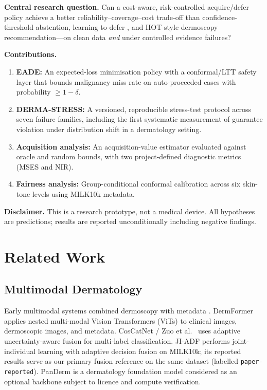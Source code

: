 \documentclass[conference]{IEEEtran}
\newcommand{\1}{\mathbf{1}}
\begin{document}
\medskip
\noindent\textbf{Central research question.} Can a cost-aware,
risk-controlled acquire/defer policy achieve a better
reliability--coverage--cost trade-off than confidence-threshold abstention,
learning-to-defer \cite{mozannar2020defer}, and HOT-style dermoscopy
recommendation---on clean data \emph{and} under controlled evidence failures?

\medskip
\noindent\textbf{Contributions.}
\begin{enumerate}[leftmargin=*, label=\textbf{C\arabic{enumi}.}]
  \item \textbf{EADE:} An expected-loss minimisation policy with a
        conformal/LTT safety layer that bounds malignancy miss rate
        on auto-proceeded cases with probability $\geq 1-\delta$.
  \item \textbf{DERMA-STRESS:} A versioned, reproducible stress-test
        protocol across seven failure families, including the first
        systematic measurement of guarantee violation under distribution
        shift in a dermatology setting.
  \item \textbf{Acquisition analysis:} An acquisition-value estimator
        evaluated against oracle and random bounds, with two
        project-defined diagnostic metrics (MSES and NIR).
  \item \textbf{Fairness analysis:} Group-conditional conformal
        calibration across six skin-tone levels using MILK10k metadata.
\end{enumerate}

\medskip
\noindent\textbf{Disclaimer.} This is a research prototype, not a medical
device. All hypotheses are predictions; results are reported
unconditionally including negative findings.

\section{Related Work}
\label{sec:related}

\subsection{Multimodal Dermatology}

Early multimodal systems combined dermoscopy with metadata
\cite{kawahara2019derm7pt}. DermFormer \cite{dermformer2025} applies nested
multi-modal Vision Transformers (ViTs) to clinical images, dermoscopic images,
and metadata. CosCatNet / Zuo et al.\ \cite{zuo2025coscatnet} uses adaptive
uncertainty-aware fusion for multi-label classification. JI-ADF
\cite{jiadf2025} performs joint-individual learning with adaptive decision
fusion on MILK10k; its reported results serve as our primary fusion reference
on the same dataset (labelled \texttt{paper-reported}). PanDerm
\cite{panderm2025} is a dermatology foundation model considered as an optional
backbone subject to licence and compute verification.
\end{document}
